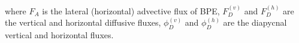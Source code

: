 where $F_{A}$ is the lateral (horizontal) advective flux of BPE, $F^{(v)}_{D}$ and $F^{(h)}_{D}$ are the vertical and horizontal diffusive fluxes, $\phi^{(v)}_D$ and $\phi^{(h)}_D$ are the diapycnal vertical and horizontal fluxes.


